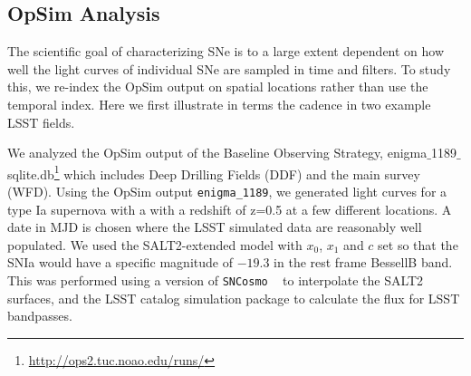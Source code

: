 



\subsection{OpSim Analysis}
\label{sec:\secname:analysis}
The scientific goal of characterizing SNe is to a large extent dependent
on how well the light curves of individual SNe are sampled in time and
filters. To study this, we re-index the OpSim output on spatial
locations rather than use the temporal index. Here we first illustrate
in terms the cadence in two example LSST fields. 












We analyzed the OpSim output of the Baseline Observing Strategy,
enigma$\_$1189$\_$sqlite.db{\footnote
{\url{http://ops2.tuc.noao.edu/runs/}}} which includes Deep Drilling
Fields (DDF) and the main survey (WFD). Using the OpSim output \texttt{enigma\_1189}, we generated 
light curves for a type Ia supernova with a with a redshift of z=0.5 at a few different
locations. A date in MJD is chosen where the LSST simulated data are
reasonably well populated. We used the SALT2-extended model
with $x_0$, $x_1$ and $c$ set so that the SNIa would have a specific
magnitude of $-19.3$ in the rest frame BessellB band. This was performed
using a version of \texttt{SNCosmo} ~ to interpolate the SALT2 surfaces, and the
LSST catalog simulation package to calculate the flux for LSST
bandpasses. 

